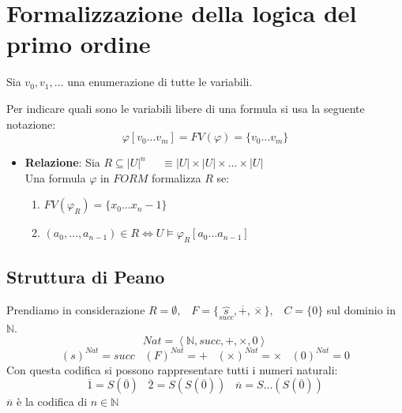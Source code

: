 \documentclass{article}
\theoremstyle{break}
\theoremstyle{break}
\theoremstyle{break}
\theoremstyle{break}
\begin{document}
\section{Formalizzazione della logica del primo ordine}
Sia \( v_0, v_1, \ldots \) una enumerazione di tutte le variabili.
\begin{define}[Notazione]
  Per indicare quali sono le variabili libere di una formula si usa la seguente notazione:
  \[
    \varphi[v_0 \ldots v_m] = FV(\varphi ) = \{v_0 \ldots v_m\} 
  \] 
  
\end{define}
\begin{itemize}
  \item \textbf{Relazione}: Sia \( R \subseteq |U|^n \;\;\;\;\; \equiv |U| \times |U| \times \ldots \times |U|\) \\
    Una formula \( \varphi  \) in \( FORM \) formalizza \( R \) se:
    \begin{enumerate}
      \item \( FV(\varphi_R) = \{x_0 \ldots x_n-1\}  \) 
      \item \( (a_0, \ldots, a_{n-1}) \in R \Leftrightarrow U \models \varphi_R[a_0 \ldots a_{n-1}] \) 
    \end{enumerate}
\end{itemize}

\subsection{Struttura di Peano}
Prendiamo in considerazione \( R = \emptyset,\;\;\;F = \{\overbrace{s}_{succ}, \overline{+}, \overline{\times}\},\;\;\; C = \{0\}\)
sul dominio in \( \mathbb{N} \).
\[
Nat = \left< \mathbb{N}, succ, +, \times , 0 \right>
\] 
\[
  (s)^{Nat} = succ \;\;\; (F)^{Nat} = + \;\;\; (\times )^{Nat} = \times \;\;\; (0)^{Nat} = 0
\] 
Con questa codifica si possono rappresentare tutti i numeri naturali:
\[
  \overline{1} = S(\overline{0}) \;\;\; \overline{2} = S(S(\overline{0})) \;\;\; \overline{n} = S...(S(\overline{0}))
\] 
\( \overline{n} \) è la codifica di \( n \in  \mathbb{N} \) 
\end{document}
